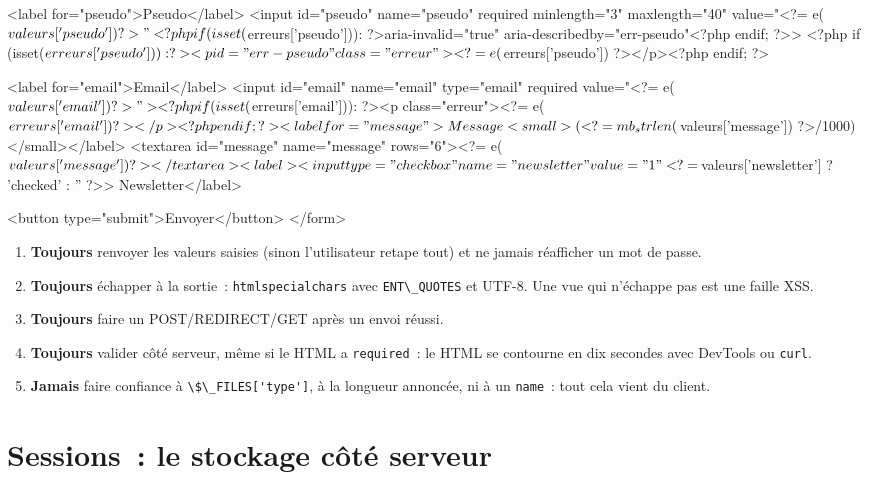 \begin{codephp}
  <label for="pseudo">Pseudo</label>
  <input id="pseudo" name="pseudo" required minlength="3" maxlength="40"
         value="<?= e($valeurs['pseudo']) ?>"
         <?php if (isset($erreurs['pseudo'])): ?>aria-invalid="true" aria-describedby="err-pseudo"<?php endif; ?>>
  <?php if (isset($erreurs['pseudo'])): ?><p id="err-pseudo" class="erreur"><?= e($erreurs['pseudo']) ?></p><?php endif; ?>

  <label for="email">Email</label>
  <input id="email" name="email" type="email" required value="<?= e($valeurs['email']) ?>">
  <?php if (isset($erreurs['email'])): ?><p class="erreur"><?= e($erreurs['email']) ?></p><?php endif; ?>

  <label for="message">Message <small>(<?= mb_strlen($valeurs['message']) ?>/1000)</small></label>
  <textarea id="message" name="message" rows="6"><?= e($valeurs['message']) ?></textarea>

  <label><input type="checkbox" name="newsletter" value="1" <?= $valeurs['newsletter'] ? 'checked' : '' ?>> Newsletter</label>

  <button type="submit">Envoyer</button>
</form>
\end{codephp}

\begin{enumerate}
  \item \textbf{Toujours} renvoyer les valeurs saisies (sinon l'utilisateur retape tout) et
        ne jamais r\'eafficher un mot de passe.
  \item \textbf{Toujours} \'echapper \`a la sortie~: \verb|htmlspecialchars| avec
        \verb|ENT\_QUOTES| et UTF-8. Une vue qui n'\'echappe pas est une faille XSS.
  \item \textbf{Toujours} faire un POST/REDIRECT/GET apr\`es un envoi r\'eussi.
  \item \textbf{Toujours} valider c\^ot\'e serveur, m\^eme si le HTML a \verb|required|~: le HTML se
        contourne en dix secondes avec DevTools ou \verb|curl|.
  \item \textbf{Jamais} faire confiance \`a \verb|\$\_FILES['type']|, \`a la longueur annonc\'ee, ni \`a
        un \verb|name|~: tout cela vient du client.
\end{enumerate}

\section{Sessions~: le stockage c\^ot\'e serveur}

